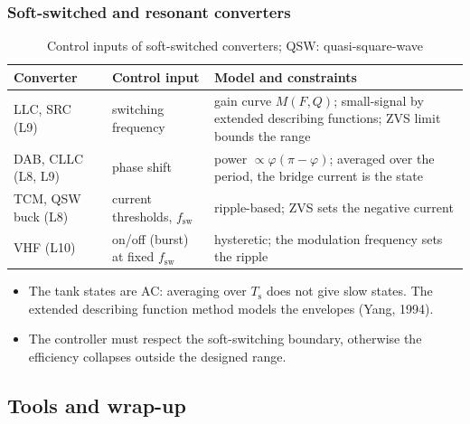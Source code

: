 \begin{frame}
	\frametitle{Soft-switched and resonant converters}
	\begin{table}
		\centering
		\scriptsize
		\begin{tabular}{|l|>{\raggedright\arraybackslash}p{2.8cm}|>{\raggedright\arraybackslash}p{6.6cm}|}
			\hline
			\textbf{Converter}  & \textbf{Control input}       & \textbf{Model and constraints}                                                                  \\
			\hline
			LLC, SRC (L9)       & switching frequency          & gain curve $M(F,Q)$; small-signal by extended describing functions; ZVS limit bounds the range    \\
			DAB, CLLC (L8, L9)  & phase shift                  & power $\propto\varphi(\pi-\varphi)$; averaged over the period, the bridge current is the state  \\
			TCM, QSW buck (L8)  & current thresholds, $f_\mathrm{sw}$ & ripple-based; ZVS sets the negative current                                              \\
			VHF (L10)           & on/off (burst) at fixed $f_\mathrm{sw}$ & hysteretic; the modulation frequency sets the ripple                                  \\
			\hline
		\end{tabular}
		\caption{Control inputs of soft-switched converters; QSW: quasi-square-wave}
	\end{table}
	\small
	\begin{itemize}
		\item The tank states are AC: averaging over $T_\mathrm{s}$ does not give slow states. The extended describing function method models the envelopes (Yang, 1994).
		\item The controller must respect the soft-switching boundary, otherwise the efficiency collapses outside the designed range.
	\end{itemize}
\end{frame}

\subsection{Tools and wrap-up}

